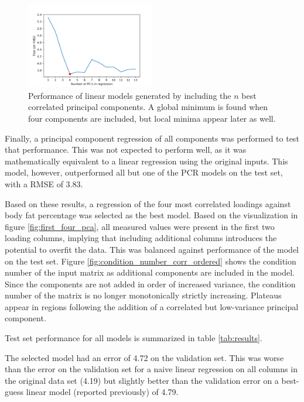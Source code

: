 \documentclass{IEEEtran}
\begin{document}
\begin{centering}
\begin{figure}
\centering
\begin{center}
	\includegraphics[width=0.5\textwidth]{selective_pcr_performance}
	\caption{Performance of linear models generated by including the $n$ best correlated principal components. A global minimum is found when four components are included, but local minima appear later as well.\label{fig:selective_pcr_performance}}
\end{center}
\end{figure}
\end{centering}

Finally, a principal component regression of all components was performed to test that performance. This was not expected to perform well, as it was mathematically equivalent to a linear regression using the original inputs. This model, however, outperformed all but one of the PCR models on the test set, with a RMSE of \num{3.83}.

Based on these results, a regression of the four most correlated loadings against body fat percentage was selected as the best model. Based on the visualization in figure \ref{fig:first_four_pca}, all measured values were present in the first two loading columns, implying that including additional columns introduces the potential to overfit the data. This was balanced against performance of the model on the test set. Figure \ref{fig:condition_number_corr_ordered} shows the condition number of the input matrix as additional components are included in the model. Since the components are not added in order of increased variance, the condition number of the matrix is no longer monotonically strictly increasing. Plateaus appear in regions following the addition of a correlated but low-variance principal component.

Test set performance for all models is summarized in table \ref{tab:results}.

The selected model had an error of \num{4.72} on the validation set. This was worse than the error on the validation set for a naive linear regression on all columns in the original data set (\num{4.19}) but slightly better than the validation error on a best-guess linear model (reported previously) of \num{4.79}.
\end{document}
